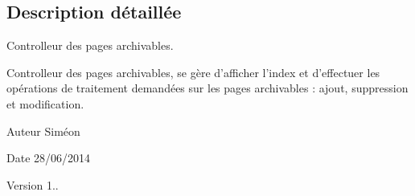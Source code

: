 \subsection{Description détaillée}
Controlleur des pages archivables. 

Controlleur des pages archivables, se gère d'afficher l'index et d'effectuer les opérations de traitement demandées sur les pages archivables \+: ajout, suppression et modification. \begin{DoxyAuthor}{Auteur}
Siméon 
\end{DoxyAuthor}
\begin{DoxyDate}{Date}
28/06/2014 
\end{DoxyDate}
\begin{DoxyVersion}{Version}
1.. 
\end{DoxyVersion}


